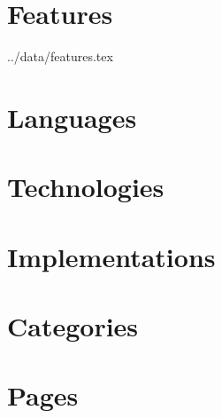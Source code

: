 \documentclass{article}
\begin{document}
\tableofcontents

\pagebreak

\section{Features}

 {../data/features.tex}

\pagebreak


\section{Languages}



\pagebreak


\section{Technologies}



\pagebreak


\section{Implementations}



\pagebreak

\section{Categories}



\pagebreak


\section{Pages}


\end{document}
